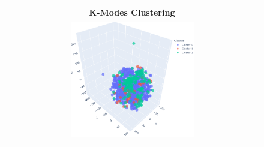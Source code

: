 \begin{figure}
\begin{tabular}{|c|c|}
		\\ \hline
	\end{tabular}
	\begin{tabular}{|c|}
	\hline
	\textbf{K-Modes Clustering} \\
	\includegraphics[width=0.5\textwidth]{NOTEBOOK/IMAGENES_CLUSTERING/9_TNSE_Kmodes}
	\\ \hline
	\end{tabular}
\end{figure}


